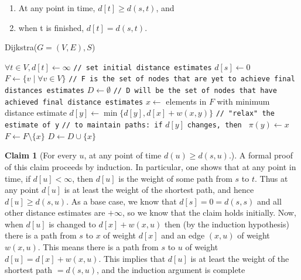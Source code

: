 \documentclass [12pt]{article}
\theoremstyle{definition}
\newtheorem{claim}{Claim}
\begin{document}
\begin{enumerate}
    \item At any point in time, $d[t] \geq d(s, t)$, and
    \item when t is finished, $d[t] = d(s, t)$.
\end{enumerate}


\begin{algorithm}
\caption{Dijkstra($G= (V,E), S$)}
\label{alg:1}
\begin{algorithmic}
\STATE $\forall t \in V, d[t] \gets \infty$ \texttt{// set initial distance estimates}
\STATE $d[s] \gets 0$
\STATE $F \gets \{v \mid \forall v \in V\}$ \texttt{// F is the set of nodes that are yet to achieve final distances estimates}
\STATE $D \gets \emptyset$ \texttt{// D will be the set of nodes that have achieved final distance estimates}
    \STATE $x \gets$ elements in $F$ with minimum distance estimate
        \STATE $d[y] \gets \min\{d[y], d[x] + w(x,y)\}$ \texttt{// "relax" the estimate of y}
        \STATE \texttt{// to maintain paths: if} $d[y]$ \texttt{changes, then } $\pi(y) \gets x$
    \ENDFOR
    \STATE $F \gets F \setminus \{x\}$
    \STATE $D \gets D \cup \{x\}$
\ENDWHILE
\end{algorithmic}
\end{algorithm}

\begin{claim}[For every $u$, at any point of time $d(u) \geq d(s, u)$.]
\vspace{1em}
A formal proof of this claim proceeds by induction. In particular, one shows that at any point in time, if $d[u] < \infty$, then $d[u]$ is the weight of some path from $s$ to $t$. Thus at any point $d[u]$ is at least the weight of the shortest path, and hence $d[u] \geq d(s, u)$. As a base case, we know that $d[s] = 0 = d(s, s)$ and all other distance estimates are $+\infty$, so we know that the claim holds initially. Now, when $d[u]$ is changed to $d[x] + w(x, u)$ then (by the induction hypothesis) there is a path from $s$ to $x$ of weight $d[x]$ and an edge $(x, u)$ of weight $w(x, u)$. This means there is a path from $s$ to $u$ of weight $d[u] = d[x] + w(x, u)$. This implies that $d[u]$ is at least the weight of the shortest path $= d(s, u)$, and the induction argument is complete
\end{claim}
\end{document}
